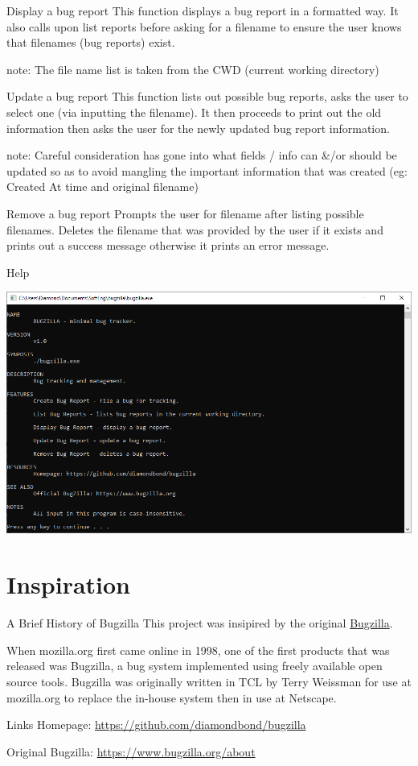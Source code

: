 \documentclass[bigger]{beamer}
\begin{document}
\begin{frame}[label={sec:orgd3f4342}]{Display a bug report}
This function displays a bug report in a formatted way.
It also calls upon list reports before asking for a filename to ensure the user knows that filenames (bug reports) exist.

note: The file name list is taken from the CWD (current working directory)
\end{frame}

\begin{frame}[label={sec:org5d4e637}]{Update a bug report}
This function lists out possible bug reports, asks the user to select one (via inputting the filename).
It then proceeds to print out the old information then asks the user for the newly updated bug report information.

note: Careful consideration has gone into what fields / info can \&/or should be updated so as to avoid mangling the important information that was created (eg: Created At time and original filename)
\end{frame}

\begin{frame}[label={sec:orge8fb03c}]{Remove a bug report}
Prompts the user for filename after listing possible filenames.
Deletes the filename that was provided by the user if it exists and prints out a success message otherwise it prints an error message.
\end{frame}

\begin{frame}[label={sec:org6666dc5}]{Help}
\begin{center}
\includegraphics[width=.9\linewidth]{../img/help.png}
\end{center}
\end{frame}

\section{Inspiration}
\label{sec:org43624bc}
\begin{frame}[label={sec:org74ab575}]{A Brief History of Bugzilla}
This project was insipired by the original \href{https://www.bugzilla.org}{Bugzilla}.

When mozilla.org first came online in 1998, one of the first products that was released was Bugzilla, a bug system implemented using freely available open source tools. Bugzilla was originally written in TCL by Terry Weissman for use at mozilla.org to replace the in-house system then in use at Netscape. 
\end{frame}

\begin{frame}[label={sec:orgf28ff9a}]{Links}
Homepage: \url{https://github.com/diamondbond/bugzilla}

Original Bugzilla: \url{https://www.bugzilla.org/about}
\end{frame}
\end{document}
